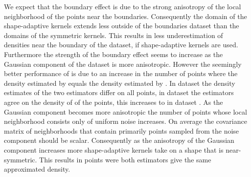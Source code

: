 			We expect that the boundary effect is due to the strong anisotropy of the local neighborhood of the points near the boundaries. Consequently the domain of the shape-adaptive kernels extends less outside of the boundaries dataset than the domains of the symmetric kernels. This results in less underestimation of densities near the boundary of the dataset, if shape-adaptive kernels are used.
			Furthermore the strength of the boundary effect seems to increase as the Gaussian component of the dataset is more anisotropic. However the seemingly better performance of \sambe is due to an increase in the number of points where the density estimated by \sambe equals the density estimated by \mbe. In dataset \ferdosiOne the density estimates of the two estimators differ on all points, in dataset \baakmanOne the estimators agree on the density of  of the points, this increases to  in dataset \baakmanFive.
			As the Gaussian component becomes more anisotropic the number of points whose local neighborhood consists only of uniform noise increases. On average the covariance matrix of neighborhoods that contain primarily points sampled from the noise component should be scalar. Consequently as the anisotropy of the Gaussian component increases more shape-adaptive kernels take on a shape that is near-symmetric. This results in points were both estimators give the same approximated density. 
	
